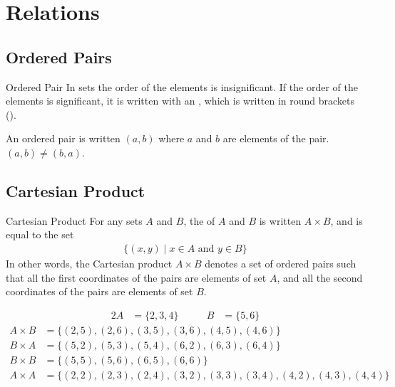\documentclass[\main/notes.tex]{subfiles}
\begin{document}
	\ifSubfilesClassLoaded{\setcounter{chapter}{4}}{}
	\chapter{Relations}
		\section{Ordered Pairs}
			\begin{definition}{Ordered Pair}
				In sets the order of the elements is insignificant. If the order of the elements is significant, it is written with an , which is written in round brackets ().
			\end{definition}
			\nopagebreak
			\begin{example}
				An ordered pair is written $(a, b)$ where $a$ and $b$ are elements of the pair. $(a, b) \neq (b, a)$.
			\end{example}
		\section{Cartesian Product}
			\begin{definition}{Cartesian Product}
				For any sets $A$ and $B$, the  of $A$ and $B$ is written $A \times B$, and is equal to the set
				\begin{align*}
					\bigl\{(x, y) \mid x \in A \text{ and } y \in B\bigr\}
				\end{align*}
				In other words, the Cartesian product $A \times B$ denotes a set of ordered pairs such that all the first coordinates of the pairs are elements of set $A$, and all the second coordinates of the pairs are elements of set $B$.
			\end{definition}
			\nopagebreak
				\begin{example}[width=0.75\textwidth]
					\begin{alignat*}{2}
						A &= \{2, 3, 4\} \qquad & B &= \{5, 6\}
					\end{alignat*}
					\begin{align*}
						A \times B &= \bigl\{(2, 5), (2, 6), (3, 5), (3, 6), (4, 5), (4, 6)\bigr\}\\
						B \times A &= \bigl\{(5, 2), (5, 3), (5, 4), (6, 2), (6, 3), (6, 4)\bigr\}\\
						B \times B &= \bigl\{(5, 5), (5, 6), (6, 5), (6, 6)\bigr\}\\
						A \times A &= \bigl\{(2, 2), (2, 3), (2, 4), (3, 2), (3, 3), (3, 4), (4, 2), (4, 3), (4, 4)\bigr\}
					\end{align*} 
				\end{example}
		\pagebreak
\end{document}
